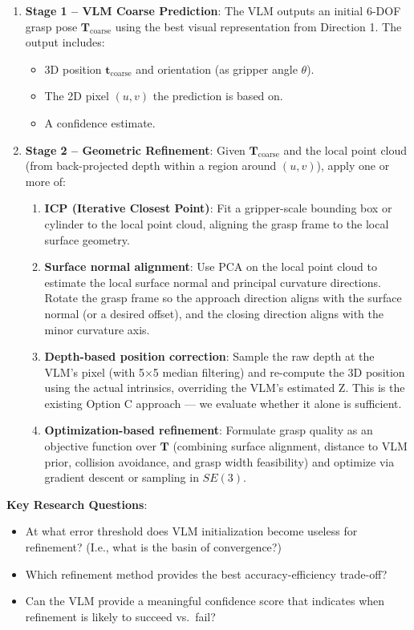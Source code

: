 \documentclass[11pt,a4paper]{article}
\begin{document}
\begin{enumerate}[leftmargin=*]
    \item \textbf{Stage 1 -- VLM Coarse Prediction}: The VLM outputs an initial 6-DOF grasp pose $\mathbf{T}_{\text{coarse}}$ using the best visual representation from Direction 1. The output includes:
    \begin{itemize}[nosep]
        \item 3D position $\mathbf{t}_{\text{coarse}}$ and orientation (as gripper angle $\theta$).
        \item The 2D pixel $(u, v)$ the prediction is based on.
        \item A confidence estimate.
    \end{itemize}

    \item \textbf{Stage 2 -- Geometric Refinement}: Given $\mathbf{T}_{\text{coarse}}$ and the local point cloud (from back-projected depth within a region around $(u, v)$), apply one or more of:
    \begin{enumerate}[label=\alph*.]
        \item \textbf{ICP (Iterative Closest Point)}: Fit a gripper-scale bounding box or cylinder to the local point cloud, aligning the grasp frame to the local surface geometry.
        \item \textbf{Surface normal alignment}: Use PCA on the local point cloud to estimate the local surface normal and principal curvature directions. Rotate the grasp frame so the approach direction aligns with the surface normal (or a desired offset), and the closing direction aligns with the minor curvature axis.
        \item \textbf{Depth-based position correction}: Sample the raw depth at the VLM's pixel (with 5$\times$5 median filtering) and re-compute the 3D position using the actual intrinsics, overriding the VLM's estimated Z. This is the existing Option C approach --- we evaluate whether it alone is sufficient.
        \item \textbf{Optimization-based refinement}: Formulate grasp quality as an objective function over $\mathbf{T}$ (combining surface alignment, distance to VLM prior, collision avoidance, and grasp width feasibility) and optimize via gradient descent or sampling in $SE(3)$.
    \end{enumerate}
\end{enumerate}

\textbf{Key Research Questions}:
\begin{itemize}[nosep]
    \item At what error threshold does VLM initialization become useless for refinement? (I.e., what is the basin of convergence?)
    \item Which refinement method provides the best accuracy-efficiency trade-off?
    \item Can the VLM provide a meaningful confidence score that indicates when refinement is likely to succeed vs.\ fail?
\end{itemize}
\end{document}
